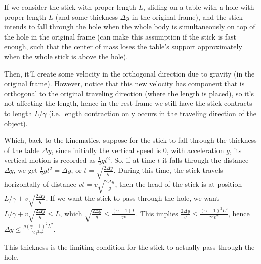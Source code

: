 \documentclass{article}
\begin{document}
If we consider the stick with proper length $L$, sliding on a table with a hole with proper length $L$ (and some thickness $\Delta y$ in the original frame), and the stick intends to fall through the hole when the whole body is simultaneously on top of the hole in the original frame (can make this assumption if the stick is fast enough, such that the center of mass loses the table's support approximately when the whole stick is above the hole).

Then, it'll create some velocity in the orthogonal direction due to gravity (in the original frame). However, notice that this new velocity has component that is orthogonal to the original traveling direction (where the length is placed), so it's not affecting the length, hence in the rest frame we still have the stick contracts to length $L/\gamma$ (i.e. length contraction only occurs in the traveling direction of the object). 

Which, back to the kinematics, suppose for the stick to fall through the thickness of the table $\Delta y$, since initially the vertical speed is $0$, with acceleration $g$, its vertical motion is recorded as $\frac{1}{2}gt^2$. So, if at time $t$ it falls through the distance $\Delta y$, we get $\frac{1}{2}gt^2=\Delta y$, or $t=\sqrt{\frac{2\Delta y}{g}}$. During this time, the stick travels horizontally of distance $vt = v\sqrt{\frac{2\Delta y}{g}}$, then the head of the stick is at position $L/\gamma + v\sqrt{\frac{2\Delta y}{g}}$. If we want the stick to pass through the hole, we want $L/\gamma + v\sqrt{\frac{2\Delta y}{g}}\leq L$, which $\sqrt{\frac{2\Delta y}{g}} \leq \frac{(\gamma -1)L}{\gamma v}$. This implies $\frac{2\Delta y}{g} \leq \frac{(\gamma-1)^2L^2}{\gamma^2 v^2}$, hence $\Delta y\leq \frac{g(\gamma-1)^2L^2}{2\gamma^2 v^2}$. 

This thickness is the limiting condition for the stick to actually pass through the hole.

\break
\end{document}
